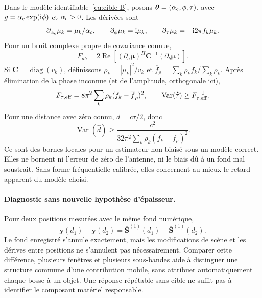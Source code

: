 \documentclass[11pt,a4paper]{article}
\newcommand{\ii}{\mathrm{i}}
\newcommand{\Reel}{\operatorname{Re}}
\newcommand{\Var}{\operatorname{Var}}
\begin{document}
Dans le modèle identifiable~\eqref{eq:cible-B}, posons
$\boldsymbol\theta=(\alpha_{\rm c},\phi,\tau)$, avec
$g=\alpha_{\rm c}\exp(\ii\phi)$ et $\alpha_{\rm c}>0$. Les dérivées sont
\begin{equation}
 \partial_{\alpha_{\rm c}}\mu_k=\mu_k/\alpha_{\rm c},\qquad
 \partial_\phi\mu_k=\ii\mu_k,\qquad
 \partial_\tau\mu_k=-\ii2\pi f_k\mu_k.
\end{equation}
Pour un bruit complexe propre de covariance connue,
\begin{equation}
 F_{ab}=2\Reel\!\left[(\partial_a\boldsymbol\mu)^H
                  \mathbf C^{-1}(\partial_b\boldsymbol\mu)\right].
\end{equation}
Si $\mathbf C=\operatorname{diag}(v_k)$, définissons
$\rho_k=|\mu_k|^2/v_k$ et
$\overline f_\rho=\sum_k\rho_k f_k/\sum_k\rho_k$.
Après élimination de la phase inconnue (et de l'amplitude, orthogonale ici),
\begin{equation}
 F_{\tau,\rm eff}=8\pi^2\sum_k\rho_k(f_k-\overline f_\rho)^2,
 \qquad
 \Var(\widehat\tau)\geq F_{\tau,\rm eff}^{-1}.
\end{equation}
Pour une distance avec zéro connu, $d=c\tau/2$, donc
\begin{equation}
 \boxed{\Var(\widehat d)\geq
 \frac{c^2}{32\pi^2\sum_k\rho_k(f_k-\overline f_\rho)^2}.}
\end{equation}
Ce sont des bornes locales pour un estimateur non biaisé sous un modèle
correct. Elles ne bornent ni l'erreur de zéro de l'antenne, ni le biais dû à
un fond mal soustrait. Sans forme fréquentielle calibrée, elles concernent
au mieux le retard apparent du modèle choisi.

\paragraph{Diagnostic sans nouvelle hypothèse d'épaisseur.}
Pour deux positions mesurées avec le même fond numérique,
\begin{equation}
 \mathbf y(d_1)-\mathbf y(d_2)
 =\overline{\mathbf S}^{(1)}(d_1)-\overline{\mathbf S}^{(1)}(d_2).
\end{equation}
Le fond enregistré s'annule exactement, mais les modifications de scène et
les dérives entre positions ne s'annulent pas nécessairement. Comparer cette
différence, plusieurs fenêtres et plusieurs sous-bandes aide à distinguer une
structure commune d'une contribution mobile, sans attribuer automatiquement
chaque bosse à un objet. Une réponse répétable sans cible ne suffit pas à
identifier le composant matériel responsable.
\end{document}
